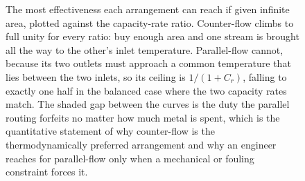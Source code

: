 \begin{figure}[htbp]
\centering
{}
\caption[Effectiveness ceilings of counter-flow and parallel-flow]{The most
effectiveness each arrangement can reach if given infinite area, plotted against
the capacity-rate ratio. Counter-flow climbs to full unity for every ratio: buy
enough area and one stream is brought all the way to the other's inlet
temperature. Parallel-flow cannot, because its two outlets must approach a common
temperature that lies between the two inlets, so its ceiling is $1/(1+C_r)$,
falling to exactly one half in the balanced case where the two capacity rates
match. The shaded gap between the curves is the duty the parallel routing forfeits
no matter how much metal is spent, which is the quantitative statement of why
counter-flow is the thermodynamically preferred arrangement and why an engineer
reaches for parallel-flow only when a mechanical or fouling constraint forces it.}
\label{fig:vol04ch06:effectiveness-ceiling}
\end{figure}

